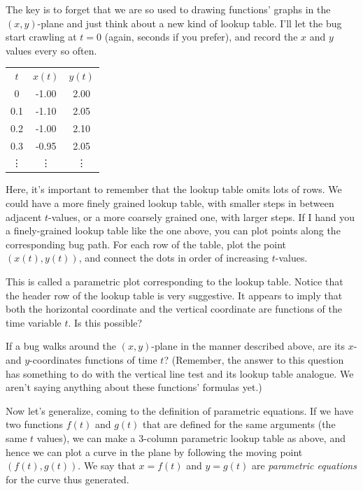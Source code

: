 \documentclass[justified]{tufte-handout}
\begin{document}
The key is to forget that we are so used to drawing functions' graphs in the $(x,y)$-plane and just think about a new kind of lookup table. I'll let the bug start crawling at $t = 0$ (again, seconds if you prefer), and record the $x$ and $y$ values every so often.

\begin{table}[h]
\centering
\begin{tabular}{|c|c|c|}
$t$ & $x(t)$ & $y(t)$ \\
0   & -1.00  & 2.00   \\
0.1 & -1.10  & 2.05   \\
0.2 & -1.00  & 2.10   \\
0.3 & -0.95  & 2.05   \\
\vdots & \vdots & \vdots
\end{tabular}
\end{table}


Here, it's important to remember that the lookup table omits lots of rows. We could have a more finely grained lookup table, with smaller steps in between adjacent $t$-values, or a more coarsely grained one, with larger steps. If I hand you a finely-grained lookup table like the one above, you can plot points along the corresponding bug path. For each row of the table, plot the point $(x(t),y(t))$, and connect the dots in order of increasing $t$-values.

This is called a parametric plot corresponding to the lookup table. Notice that the header row of the lookup table is very suggestive. It appears to imply that both the horizontal coordinate and the vertical coordinate are functions of the time variable $t$. Is this possible?
\begin{marginnote}
	If a bug walks around the $(x,y)$-plane in the manner described above, are its $x$- and $y$-coordinates functions of time $t$? (Remember, the answer to this question has something to do with the vertical line test and its lookup table analogue. We aren't saying anything about these functions' formulas yet.)
\end{marginnote}

Now let's generalize, coming to the definition of parametric equations. If we have two functions $f(t)$ and $g(t)$ that are defined for the same arguments (the same $t$ values), we can make a 3-column parametric lookup table as above, and hence we can plot a curve in the plane by following the moving point $(f(t), g(t))$. We say that $x = f(t)$ and $y = g(t)$ are \emph{parametric equations} for the curve thus generated.
\end{document}
